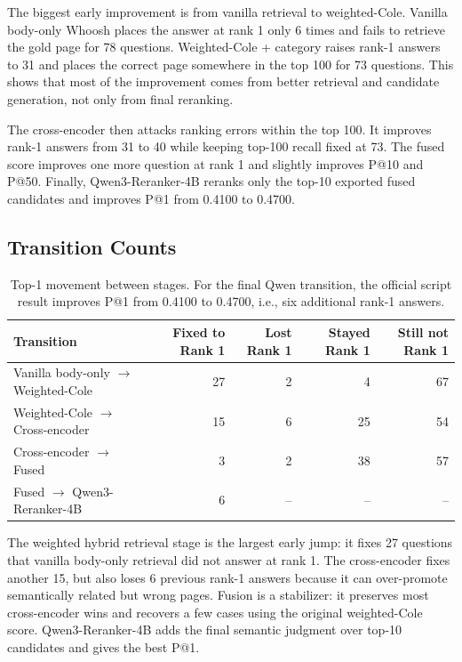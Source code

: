 \documentclass[11pt]{article}
\begin{document}
The biggest early improvement is from vanilla retrieval to weighted-Cole. Vanilla body-only Whoosh places the answer at rank 1 only 6 times and fails to retrieve the gold page for 78 questions. Weighted-Cole + category raises rank-1 answers to 31 and places the correct page somewhere in the top 100 for 73 questions. This shows that most of the improvement comes from better retrieval and candidate generation, not only from final reranking.

The cross-encoder then attacks ranking errors within the top 100. It improves rank-1 answers from 31 to 40 while keeping top-100 recall fixed at 73. The fused score improves one more question at rank 1 and slightly improves P@10 and P@50. Finally, Qwen3-Reranker-4B reranks only the top-10 exported fused candidates and improves P@1 from 0.4100 to 0.4700.

\subsection{Transition Counts}

\begin{table}[h]
\centering
\scriptsize
\begin{tabular}{lrrrr}
\toprule
Transition & Fixed to Rank 1 & Lost Rank 1 & Stayed Rank 1 & Still not Rank 1 \\
\midrule
Vanilla body-only $\rightarrow$ Weighted-Cole & 27 & 2 & 4 & 67 \\
Weighted-Cole $\rightarrow$ Cross-encoder & 15 & 6 & 25 & 54 \\
Cross-encoder $\rightarrow$ Fused & 3 & 2 & 38 & 57 \\
Fused $\rightarrow$ Qwen3-Reranker-4B & 6 & -- & -- & -- \\
\bottomrule
\end{tabular}
\caption{Top-1 movement between stages. For the final Qwen transition, the official script result improves P@1 from 0.4100 to 0.4700, i.e., six additional rank-1 answers.}
\end{table}

The weighted hybrid retrieval stage is the largest early jump: it fixes 27 questions that vanilla body-only retrieval did not answer at rank 1. The cross-encoder fixes another 15, but also loses 6 previous rank-1 answers because it can over-promote semantically related but wrong pages. Fusion is a stabilizer: it preserves most cross-encoder wins and recovers a few cases using the original weighted-Cole score. Qwen3-Reranker-4B adds the final semantic judgment over top-10 candidates and gives the best P@1.
\end{document}
